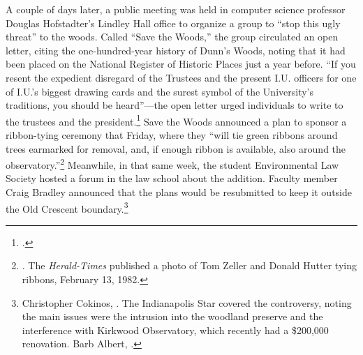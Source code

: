 \documentclass[
  american,
  letterpaper,
]{scrreprt}
\begin{document}
A couple of days later, a public meeting was held in computer science
professor Douglas Hofstadter's Lindley Hall office to organize a group
to ``stop this ugly threat'' to the woods. Called ``Save the Woods,''
the group circulated an open letter, citing the one-hundred-year history
of Dunn's Woods, noting that it had been placed on the National Register
of Historic Places just a year before. ``If you resent the expedient
disregard of the Trustees and the present I.U. officers for one of
I.U.'s biggest drawing cards and the surest symbol of the University's
traditions, you should be heard''---the open letter urged individuals to
write to the trustees and the president.\footnote{.} Save the Woods
announced a plan to sponsor a ribbon-tying ceremony that Friday, where
they ``will tie green ribbons around trees earmarked for removal, and,
if enough ribbon is available, also around the observatory.''\footnote{. The
  \emph{Herald-Times} published a photo of Tom Zeller and Donald Hutter
  tying ribbons, February 13, 1982.} Meanwhile, in that same week, the
student Environmental Law Society hosted a forum in the law school about
the addition. Faculty member Craig Bradley announced that the plans
would be resubmitted to keep it outside the Old Crescent
boundary.\footnote{Christopher Cokinos,
  . The
  Indianapolis Star covered the controversy, noting the main issues were
  the intrusion into the woodland preserve and the interference with
  Kirkwood Observatory, which recently had a \$200,000 renovation. Barb
  Albert, .}
\end{document}
